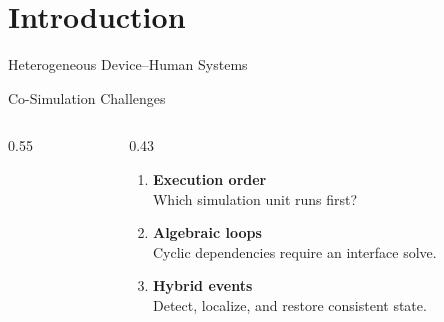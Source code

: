 
\section{Introduction}

\begin{frame}[fragile]{Heterogeneous Device--Human Systems}
    \centering
    \vspace{-0.35em}
    \begingroup
        \resizebox{!}{0.86\textheight}{%
        }
    \endgroup
\end{frame}

\begin{frame}{Co-Simulation Challenges}
  \begin{columns}[T]
    \begin{column}{0.55\textwidth}
      \centering
      \resizebox{\linewidth}{!}{%
      }
    \end{column}
    \begin{column}{0.43\textwidth}
        \begin{enumerate}
            \item \textbf{Execution order}\\
            Which simulation unit runs first?
            \vspace{0.8em}
            \item \textbf{Algebraic loops}\\
            Cyclic dependencies require an interface solve.
            \vspace{0.8em}
            \item \textbf{Hybrid events}\\
            Detect, localize, and restore consistent state.
        \end{enumerate}
    \end{column}
  \end{columns}
\end{frame}

